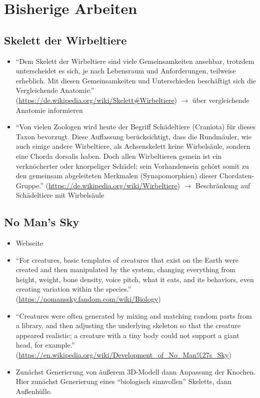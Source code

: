 
\chapter{Bisherige Arbeiten}

\section{Skelett der Wirbeltiere}

\begin{itemize}
 \item "`Dem Skelett der Wirbeltiere sind viele Gemeinsamkeiten ansehbar, trotzdem unterscheidet es sich, je nach Lebensraum und Anforderungen, teilweise erheblich. Mit diesen Gemeinsamkeiten und Unterschieden beschäftigt sich die Vergleichende Anatomie."' (\url{https://de.wikipedia.org/wiki/Skelett#Wirbeltiere}) $\rightarrow$ über vergleichende Anatomie informieren
 \item "`Von vielen Zoologen wird heute der Begriff Schädeltiere (Craniota) für dieses Taxon bevorzugt. Diese Auffassung berücksichtigt, dass die Rundmäuler, wie auch einige andere Wirbeltiere, als Achsenskelett keine Wirbelsäule, sondern eine Chorda dorsalis haben. Doch allen Wirbeltieren gemein ist ein verknöcherter oder knorpeliger Schädel; sein Vorhandensein gehört somit zu den gemeinsam abgeleiteten Merkmalen (Synapomorphien) dieser Chordaten-Gruppe."' (\url{https://de.wikipedia.org/wiki/Wirbeltiere}) $\rightarrow$ Beschränkung auf Schädeltiere mit Wirbelsäule
\end{itemize}


\section{No Man's Sky}

\begin{itemize}
 \item Webseite \cite{NoMansSky}
 \item "`For creatures, basic templates of creatures that exist on the Earth were created and then manipulated by the system, changing everything from height, weight, bone density, voice pitch, what it eats, and its behaviors, even creating variation within the species."' (\url{https://nomanssky.fandom.com/wiki/Biology})
 \item "`Creatures were often generated by mixing and matching random parts from a library, and then adjusting the underlying skeleton so that the creature appeared realistic; a creature with a tiny body could not support a giant head, for example."' (\url{https://en.wikipedia.org/wiki/Development_of_No_Man\%27s_Sky})
 \item Zunächst Generierung von äußerem 3D-Modell dann Anpassung der Knochen. Hier zunächst Generierung eines "`biologisch sinnvollen"' Skeletts, dann Außenhülle.
\end{itemize}


